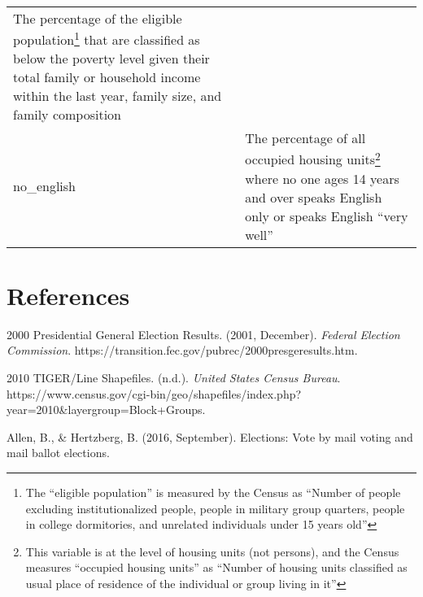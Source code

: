 \documentclass[12pt,twoside]{reedthesis}
\begin{document}
\begin{longtable}[]{@{}ll@{}}
\begin{minipage}[t]{0.50\columnwidth}
The percentage of the eligible population\footnote{The ``eligible population'' is measured by the Census as ``Number of people excluding institutionalized people, people in military group quarters, people in college dormitories, and unrelated individuals under 15 years old''} that are classified as below the poverty level given their total family or household income within the last year, family size, and family composition\strut
\end{minipage}\tabularnewline
\begin{minipage}[t]{0.44\columnwidth}\raggedright
no\_english\strut
\end{minipage} & \begin{minipage}[t]{0.50\columnwidth}\raggedright
The percentage of all occupied housing units\footnote{This variable is at the level of housing units (not persons), and the Census measures ``occupied housing units'' as ``Number of housing units classified as usual place of residence of the individual or group living in it''} where no one ages 14 years and over speaks English only or speaks English ``very well''\strut
\end{minipage}\tabularnewline
\bottomrule
\end{longtable}
\backmatter

\hypertarget{references}{%
\chapter*{References}\label{references}}


\noindent

\setlength{\parindent}{-0.20in}
\setlength{\leftskip}{0.20in}
\setlength{\parskip}{8pt}

\hypertarget{refs}{}
\leavevmode\hypertarget{ref-noauthor_2000_2001}{}%
2000 Presidential General Election Results. (2001, December). \emph{Federal Election Commission}. https://transition.fec.gov/pubrec/2000presgeresults.htm.

\leavevmode\hypertarget{ref-noauthor_2010_nodate}{}%
2010 TIGER/Line Shapefiles. (n.d.). \emph{United States Census Bureau}. https://www.census.gov/cgi-bin/geo/shapefiles/index.php?year=2010\&layergroup=Block+Groups.

\leavevmode\hypertarget{ref-allen_elections_2016}{}%
Allen, B., \& Hertzberg, B. (2016, September). Elections: Vote by mail voting and mail ballot elections.
\end{document}
